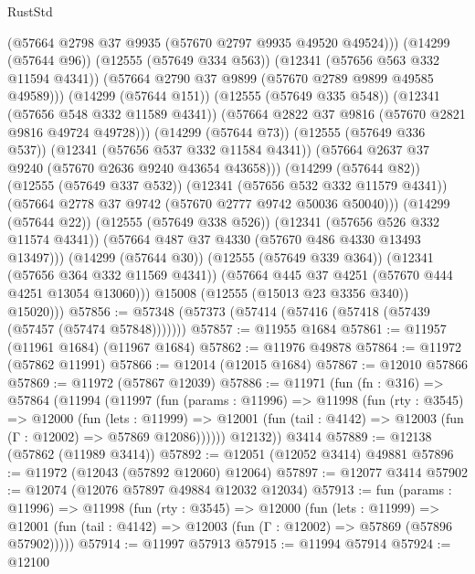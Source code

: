 \begin{lexlean}{RustStd}
\begin{coremodule}
                        (@57664 @2798 @37 @9935 (@57670 @2797 @9935 @49520 @49524)))
                      (@14299 (@57644 @96))
                      (@12555 (@57649 @334 @563))
                      (@12341 (@57656 @563 @332 @11594 @4341))
                      (@57664 @2790 @37 @9899 (@57670 @2789 @9899 @49585 @49589)))
                    (@14299 (@57644 @151))
                    (@12555 (@57649 @335 @548))
                    (@12341 (@57656 @548 @332 @11589 @4341))
                    (@57664 @2822 @37 @9816 (@57670 @2821 @9816 @49724 @49728)))
                  (@14299 (@57644 @73))
                  (@12555 (@57649 @336 @537))
                  (@12341 (@57656 @537 @332 @11584 @4341))
                  (@57664 @2637 @37 @9240 (@57670 @2636 @9240 @43654 @43658)))
                (@14299 (@57644 @82))
                (@12555 (@57649 @337 @532))
                (@12341 (@57656 @532 @332 @11579 @4341))
                (@57664 @2778 @37 @9742 (@57670 @2777 @9742 @50036 @50040)))
              (@14299 (@57644 @22))
              (@12555 (@57649 @338 @526))
              (@12341 (@57656 @526 @332 @11574 @4341))
              (@57664 @487 @37 @4330 (@57670 @486 @4330 @13493 @13497)))
            (@14299 (@57644 @30))
            (@12555 (@57649 @339 @364))
            (@12341 (@57656 @364 @332 @11569 @4341))
            (@57664 @445 @37 @4251 (@57670 @444 @4251 @13054 @13060)))
          @15008
          (@12555 (@15013 @23 @3356 @340))
          @15020)))
@57856 := @57348 (@57373 (@57414 (@57416 (@57418 (@57439 (@57457 (@57474 @57848)))))))
@57857 := @11955 @1684
@57861 := @11957 (@11961 @1684) (@11967 @1684)
@57862 := @11976 @49878
@57864 := @11972 (@57862 @11991)
@57866 := @12014 (@12015 @1684)
@57867 := @12010 @57866
@57869 := @11972 (@57867 @12039)
@57886 := @11971
    (fun (fn : @316) =>
    @57864
      (@11994
        (@11997
          (fun (params : @11996) =>
          @11998
            (fun (rty : @3545) =>
            @12000
              (fun (lets : @11999) =>
              @12001 (fun (tail : @4142) => @12003 (fun (Γ : @12002) => @57869 @12086))))))
        @12132))
    @3414
@57889 := @12138 (@57862 (@11989 @3414))
@57892 := @12051 (@12052 @3414) @49881
@57896 := @11972 (@12043 (@57892 @12060) @12064)
@57897 := @12077 @3414
@57902 := @12074 (@12076 @57897 @49884 @12032 @12034)
@57913 := fun (params : @11996) =>
  @11998
    (fun (rty : @3545) =>
    @12000
      (fun (lets : @11999) =>
      @12001 (fun (tail : @4142) => @12003 (fun (Γ : @12002) => @57869 (@57896 @57902)))))
@57914 := @11997 @57913
@57915 := @11994 @57914
@57924 := @12100

\end{coremodule}
\end{lexlean}
